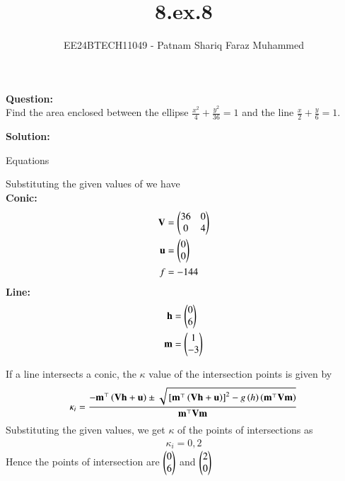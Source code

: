 \documentclass[journal]{IEEEtran}
\numberwithin{equation}{enumi}
\numberwithin{figure}{enumi}
\begin{document}


\title{8.ex.8}
\author{EE24BTECH11049 - Patnam Shariq Faraz Muhammed}

{\let\newpage\relax\maketitle}

\textbf{Question:}\\
Find the area enclosed between the ellipse $\frac{x^2}{4}+\frac{y^2}{36} = 1$ and the line $\frac{x}{2} + \frac{y}{6} = 1$.

\textbf{Solution:}\\
\begin{table}[!ht]
    \centering
    
    \caption{Equations}
    \label{tab:my_label}
\end{table}

Substituting the given values of we have\\
\textbf{Conic:}
\begin{align}
    \Vec{V} &= \myvec{36 & 0\\ 0 & 4}\\
    \Vec{u} &= \myvec{0 \\ 0}\\
    f &= -144
\end{align}
\textbf{Line:}
\begin{align}
    \Vec{h} &= \myvec{0 \\ 6}\\
    \Vec{m} &= \myvec{1 \\ -3}
\end{align}

If a line intersects a conic, the $\kappa$ value of the intersection points is given by
\begin{align}
    \kappa_i=\frac{-\mathbf{m}^{\top}\left(\mathbf{Vh}+\mathbf{u}\right)\pm\sqrt{{}\left[\mathbf{m}^{\top}\left(\mathbf{Vh}+\mathbf{u}\right)\right]^2-g\left(h\right)\left(\mathbf{m}^{\top}\mathbf{Vm}\right)}}{\mathbf{m}^{\top}\mathbf{Vm}}
\end{align}
Substituting the given values, we get $\kappa$ of the points of intersections as 
\begin{align}
    \kappa_i = 0, 2
\end{align}
Hence the points of intersection are $\begin{pmatrix}0 \\ 6\end{pmatrix}$ and $\begin{pmatrix}2 \\ 0\end{pmatrix}$\\
\end{document}
